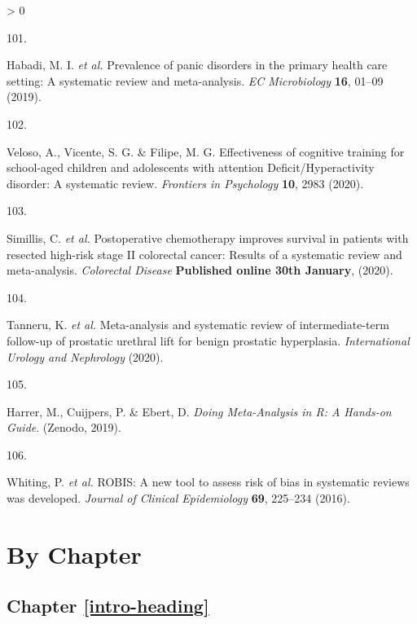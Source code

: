 \documentclass[a4paper, twoside]{templates/ociamthesis}
\newlength{\cslhangindent}
\newlength{\csllabelwidth}
\newenvironment{CSLReferences}[3] %
 {%
  \setlength{\parindent}{0pt}
  \ifodd #1 \everypar{\setlength{\hangindent}{\cslhangindent}}\ignorespaces\fi
  \ifnum #2 > 0
  \setlength{\parskip}{#2\baselineskip}
  \fi
 }%
 {}
\newcommand{\CSLLeftMargin}[1]{\parbox[t]{\maxof{\widthof{#1}}{\csllabelwidth}}{#1}}
\newcommand{\CSLRightInline}[1]{\parbox[t]{\linewidth - \csllabelwidth}{#1}}
\begin{document}
\begin{CSLReferences}{0}{0}
\leavevmode\hypertarget{ref-habadi2019prevalence}{}%
\CSLLeftMargin{101. }
\CSLRightInline{Habadi, M. I. \emph{et al.} Prevalence of panic disorders in the primary health care setting: {A} systematic review and meta-analysis. \emph{EC Microbiology} \textbf{16}, 01--09 (2019).}

\leavevmode\hypertarget{ref-veloso2020effectiveness}{}%
\CSLLeftMargin{102. }
\CSLRightInline{Veloso, A., Vicente, S. G. \& Filipe, M. G. Effectiveness of cognitive training for school-aged children and adolescents with attention {Deficit}/{Hyperactivity} disorder: {A} systematic review. \emph{Frontiers in Psychology} \textbf{10}, 2983 (2020).}

\leavevmode\hypertarget{ref-simillis2020}{}%
\CSLLeftMargin{103. }
\CSLRightInline{Simillis, C. \emph{et al.} Postoperative chemotherapy improves survival in patients with resected high-risk stage {II} colorectal cancer: Results of a systematic review and meta-analysis. \emph{Colorectal Disease} \textbf{Published online 30th January}, (2020).}

\leavevmode\hypertarget{ref-tanneru2020}{}%
\CSLLeftMargin{104. }
\CSLRightInline{Tanneru, K. \emph{et al.} Meta-analysis and systematic review of intermediate-term follow-up of prostatic urethral lift for benign prostatic hyperplasia. \emph{International Urology and Nephrology} (2020).}

\leavevmode\hypertarget{ref-mathias_harrer_2019_2551803}{}%
\CSLLeftMargin{105. }
\CSLRightInline{Harrer, M., Cuijpers, P. \& Ebert, D. \emph{Doing {Meta}-{Analysis} in {R}: {A Hands}-on {Guide}}. ({Zenodo}, 2019).}

\leavevmode\hypertarget{ref-whiting2016robis}{}%
\CSLLeftMargin{106. }
\CSLRightInline{Whiting, P. \emph{et al.} {ROBIS}: A new tool to assess risk of bias in systematic reviews was developed. \emph{Journal of Clinical Epidemiology} \textbf{69}, 225--234 (2016).}

\end{CSLReferences}

\startappendices

\hypertarget{chapter-appendix-heading}{%
\chapter{By Chapter}\label{chapter-appendix-heading}}

\hypertarget{appendix-into}{%
\section{Chapter \ref{intro-heading}}\label{appendix-into}}
\end{document}
